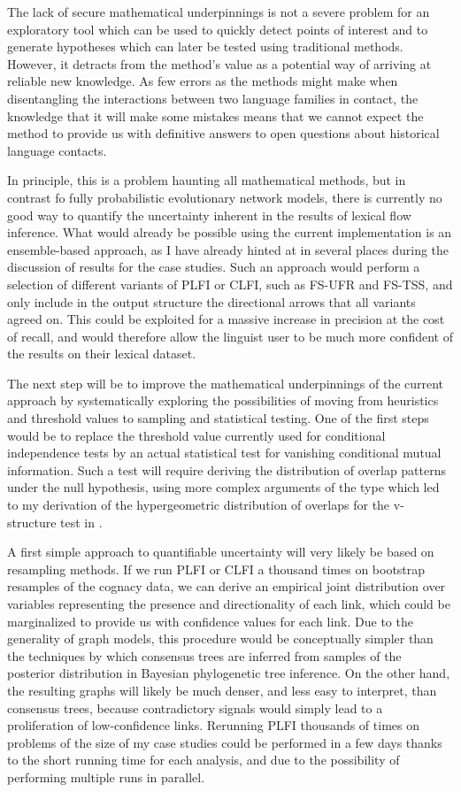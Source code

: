 The lack of secure mathematical underpinnings is not a severe problem for an exploratory tool which can be used to quickly detect points of interest and to generate hypotheses which can later be tested using traditional methods. However, it detracts from the method's value as a potential way of arriving at reliable new knowledge. As few errors as the methods might make when disentangling the interactions between two language families in contact, the knowledge that it will make some mistakes means that we cannot expect the method to provide us with definitive answers to open questions about historical language contacts. 

In principle, this is a problem haunting all mathematical methods, but in contrast fo fully probabilistic evolutionary network models, there is currently no good way to quantify the uncertainty inherent in the results of lexical flow inference. What would already be possible using the current implementation is an ensemble-based approach, as I have already hinted at in several places during the discussion of results for the case studies. Such an approach would perform a selection of different variants of PLFI or CLFI, such as FS-UFR and FS-TSS, and only include in the output structure the directional arrows that all variants agreed on. This could be exploited for a massive increase in precision at the cost of recall, and would therefore allow the linguist user to be much more confident of the results on their lexical dataset.

The next step will be to improve the mathematical underpinnings of the current approach by systematically exploring the possibilities of moving from heuristics and threshold values to sampling and statistical testing. One of the first steps would be to replace the threshold value currently used for conditional independence tests by an actual statistical test for vanishing conditional mutual information. Such a test will require deriving the distribution of overlap patterns under the null hypothesis, using more complex arguments of the type which led to my derivation of the hypergeometric distribution of overlaps for the v-structure test in .

A first simple approach to quantifiable uncertainty will very likely be based on resampling methods. If we run PLFI or CLFI a thousand times on bootstrap resamples of the cognacy data, we can derive an empirical joint distribution over variables representing the presence and directionality of each link, which could be marginalized to provide us with confidence values for each link. Due to the generality of graph models, this procedure would be conceptually simpler than the techniques by which consensus trees are inferred from samples of the posterior distribution in Bayesian phylogenetic tree inference. On the other hand, the resulting graphs will likely be much denser, and less easy to interpret, than consensus trees, because contradictory signals would simply lead to a proliferation of low-confidence links. Rerunning PLFI thousands of times on problems of the size of my case studies could be performed in a few days thanks to the short running time for each analysis, and due to the possibility of performing multiple runs in parallel.

